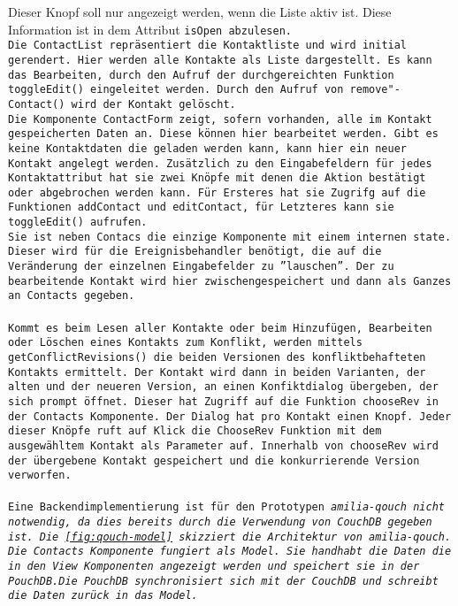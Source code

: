 Dieser Knopf soll nur angezeigt werden, wenn die Liste aktiv ist. Diese Information ist in dem  Attribut \tt{isOpen} abzulesen.\\
Die \tt{ContactList} repräsentiert die Kontaktliste und wird initial gerendert. Hier werden alle Kontakte als Liste dargestellt.
Es kann das Bearbeiten, durch den Aufruf der durchgereichten Funktion \tt{toggleEdit()} eingeleitet werden. Durch den Aufruf von \tt{remove"-Contact()} wird der Kontakt gelöscht.\\
%
Die Komponente \tt{ContactForm} zeigt, sofern vorhanden, alle im Kontakt gespeicherten Daten an.
Diese können hier bearbeitet werden.
Gibt es keine Kontaktdaten die geladen werden kann, kann hier ein neuer Kontakt angelegt werden.
Zusätzlich zu den Eingabefeldern für jedes Kontaktattribut hat sie zwei Knöpfe mit denen die Aktion bestätigt oder abgebrochen werden kann.
Für Ersteres hat sie Zugrifg auf die Funktionen \tt{addContact} und \tt{editContact}, für Letzteres kann sie \tt{toggleEdit()} aufrufen.\\
Sie ist neben \tt{Contacs} die einzige Komponente mit einem internen \tt{state}.
Dieser wird für die Ereignisbehandler benötigt, die auf die Veränderung der einzelnen Eingabefelder zu ''lauschen''. Der zu bearbeitende Kontakt wird hier zwischengespeichert und dann als Ganzes an \tt{Contacts} gegeben.\\
\\
Kommt es beim Lesen aller Kontakte oder beim Hinzufügen, Bearbeiten oder Löschen eines Kontakts zum Konflikt, werden mittels \tt{getConflictRevisions()} die beiden Versionen des konfliktbehafteten Kontakts ermittelt. Der Kontakt wird dann in beiden Varianten, der alten und der neueren Version, an einen Konfiktdialog übergeben, der sich prompt öffnet. Dieser hat Zugriff auf die Funktion \tt{chooseRev} in der \tt{Contacts} Komponente. Der Dialog hat pro Kontakt einen Knopf. Jeder dieser Knöpfe ruft auf Klick die \tt{ChooseRev} Funktion mit dem ausgewähltem Kontakt als Parameter auf.
Innerhalb von \tt{chooseRev} wird der übergebene Kontakt gespeichert und die konkurrierende Version verworfen.\\\\
%
% 
%
Eine Backendimplementierung ist für den Prototypen \it{amilia-qouch} nicht notwendig, da dies bereits durch die Verwendung von CouchDB gegeben ist.
Die \autoref{fig:qouch-model} skizziert die Architektur von \it{amilia-qouch}. Die Contacts Komponente fungiert als Model. Sie handhabt die Daten die in den View Komponenten angezeigt werden und speichert sie in der PouchDB.Die PouchDB synchronisiert sich mit der CouchDB und schreibt die Daten zurück in das Model.  
